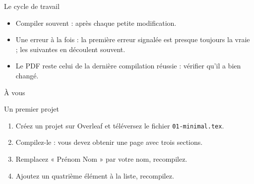 \begin{frame}{Le cycle de travail}
  \small
  \begin{itemize}
    \item Compiler souvent : après chaque petite modification.
    \item Une erreur à la fois : la première erreur signalée est presque
      toujours la vraie ; les suivantes en découlent souvent.
    \item Le PDF reste celui de la dernière compilation réussie : vérifier
      qu'il a bien changé.
  \end{itemize}
\end{frame}

\begin{frame}{À vous}
  \begin{Exercice}{Un premier projet}
    \small
    \begin{enumerate}
      \item Créez un projet sur Overleaf et téléversez le fichier
        \texttt{01-minimal.tex}.
      \item Compilez-le : vous devez obtenir une page avec trois sections.
      \item Remplacez « Prénom Nom » par votre nom, recompilez.
      \item Ajoutez un quatrième élément à la liste, recompilez.
    \end{enumerate}
  \end{Exercice}
\end{frame}
